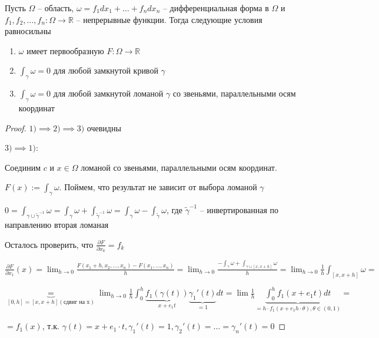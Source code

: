 \begin{theorem}
    Пусть $\Omega$ -- область, $\omega = f_1dx_1 + \dots + f_ndx_n$ -- дифференциальная форма в $\Omega$ и $f_1, f_2, \dots, f_n: \Omega \to \mathbb{R}$ -- непрерывные функции. Тогда следующие условия равносильны

    \begin{enumerate}
        \item $\omega$ имеет первообразную $F: \Omega \to \mathbb{R}$
        \item $\int_{\gamma}^{}\omega = 0$ для любой замкнутой кривой $\gamma$
        \item $\int_{\gamma}^{}\omega = 0$ для любой замкнутой ломаной $\gamma$ со звеньями, параллельными осям координат
    \end{enumerate}
\end{theorem}

\begin{proof}
    $1) \implies 2) \implies 3)$ очевидны

    $3) \implies 1)$: 

    Соединим $c$ и $x \in \Omega$ ломаной со звеньями, параллельными осям координат. 
    
    $F(x) := \int_{\gamma}^{}\omega$. Поймем, что результат не зависит от выбора ломаной $\gamma$

    $0 = \int_{\gamma \cup \tilde{\gamma}^{-1}}^{}\omega = \int_{\gamma}^{}\omega + \int_{\tilde{\gamma}^{-1}}^{}\omega = \int_{\gamma}^{}\omega - \int_{\tilde{\gamma}}^{}\omega$, где $\tilde{\gamma}^{-1}$ -- инвертированная по направлению вторая ломаная

    Осталось проверить, что $\frac{\partial F}{\partial x_k} = f_k$

    $\frac{\partial F}{\partial x_1}(x) = \lim_{h \to 0} \frac{F(x_1 + h, x_2, \dots, x_n) - F(x_1, \dots, x_n)}{h} = \lim_{h \to 0} \frac{-\int_{\gamma}^{}\omega + \int_{\gamma \sqcup [x, x + h]}^{}\omega}{h} = \lim_{h \to 0} \frac{1}{h}\int_{[x, x + h]}^{}\omega =$
    
    $ \underbrace{=}_{[0, h] = [x, x + h] (\text{сдвиг на x})} \lim_{h \to 0} \frac{1}{h}\int_{0}^{h}\underbrace{f_1(\gamma(t))}_{x + e_1t}\underbrace{\gamma_1'(t)}_{= 1}dt = \lim \frac{1}{h}\underbrace{\int_{0}^{h}f_1(x + e_1t)dt}_{= h \cdot f_1(x + e_1h\cdot\theta), \theta \in (0, 1)} =$
    
    $ = f_1(x)$, т.к. $\gamma(t) = x + e_1 \cdot t, \gamma_1'(t) = 1, \gamma_2'(t) = \dots = \gamma_n'(t) = 0$
\end{proof}

